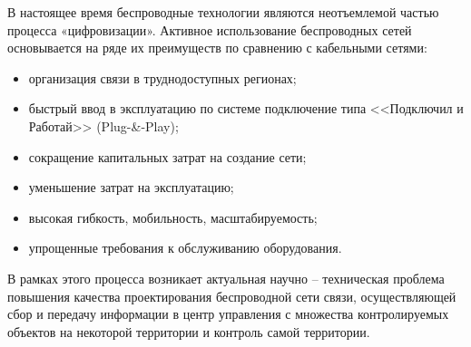  

В настоящее время беспроводные технологии являются неотъемлемой частью процесса «цифровизации». Активное использование беспроводных сетей основывается на ряде их преимуществ по сравнению с кабельными сетями:
\begin{itemize}
    \item организация связи в труднодоступных регионах;
    \item быстрый ввод в эксплуатацию по системе подключение типа <<Подключил и Работай>> (Plug-\&-Play);
    \item сокращение капитальных затрат на создание сети; 
    \item уменьшение затрат на эксплуатацию;
    \item высокая гибкость, мобильность, масштабируемость;
    \item упрощенные требования к обслуживанию оборудования.
\end{itemize}

В рамках этого процесса возникает актуальная научно -- техническая проблема повышения качества проектирования беспроводной сети связи, осуществляющей сбор и передачу информации в центр  управления с множества контролируемых объектов на некоторой территории и контроль самой территории.   






